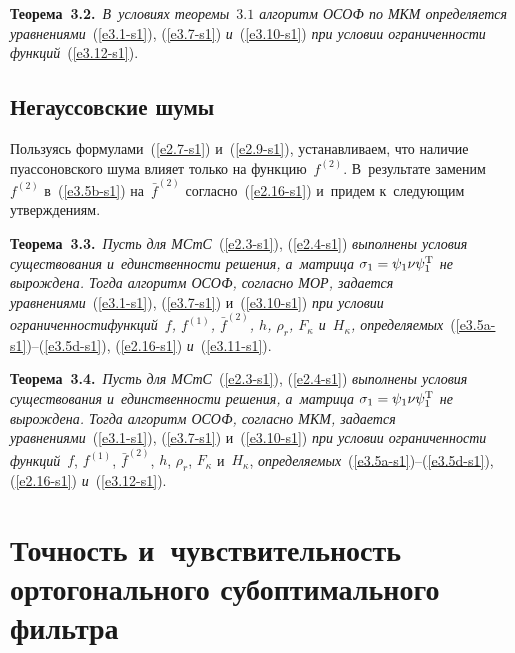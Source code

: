 \begin{multicols}{2}
\vspace*{3pt}

\noindent
\textbf{Теорема~3.2.}\
\textit{В~условиях теоремы~$3.1$ алгоритм ОСОФ по МКМ определяется 
уравнениями}~(\ref{e3.1-s1}),
(\ref{e3.7-s1}) \textit{и}~(\ref{e3.10-s1}) 
\textit{при условии ограниченности функций}~(\ref{e3.12-s1}).

\vspace*{-3pt}

\subsection{Негауссовские шумы}

Пользуясь формулами~(\ref{e2.7-s1}) и~(\ref{e2.9-s1}), устанавливаем, что наличие
 пуассоновского шума влияет только на функцию~$f^{(2)}$. В~результате заменим~$f^{(2)}$ 
 в~(\ref{e3.5b-s1}) на~$\bar f^{(2)}$ согласно~(\ref{e2.16-s1}) 
 и~придем к~следующим утверждениям.

\vspace*{3pt}

\noindent
\textbf{Теорема~3.3.}\
\textit{Пусть для МСтС}~(\ref{e2.3-s1}), (\ref{e2.4-s1}) 
\textit{выполнены условия существования и~единственности решения, а~мат\-ри\-ца $\si_1\hm=
\psi_1\nu\psi_1^{\mathrm{T}}$ не вырождена. Тогда алгоритм ОСОФ, согласно МОР, задается
 уравнениями}~(\ref{e3.1-s1}), (\ref{e3.7-s1}) и~(\ref{e3.10-s1}) 
 \textit{при условии ограниченности\linebreak функций~$f$, $f^{(1)}$, $\bar f^{(2)}$, 
 $h$, $\rho_r$, $F_\kappa$ и~$H_\kappa$, определя\-емых}~(\ref{e3.5a-s1})--(\ref{e3.5d-s1}), 
 (\ref{e2.16-s1})
 \textit{и}~(\ref{e3.11-s1}).

\vspace*{3pt}

\noindent
\textbf{Теорема~3.4.}\
\textit{Пусть для МСтС}~(\ref{e2.3-s1}), (\ref{e2.4-s1}) 
\textit{выполнены условия существования и~единственности решения, а~мат\-ри\-ца 
$\si_1\hm=\psi_1\nu\psi_1^{\mathrm{T}}$ не вырождена. Тогда алгоритм ОСОФ, 
согласно МКМ, задается уравнениями}~(\ref{e3.1-s1}), (\ref{e3.7-s1}) 
и~(\ref{e3.10-s1}) \textit{при условии ограниченности функций}~$f$, 
$f^{(1)}$, $\bar f^{(2)}$, $h$, $\rho_r$, $F_\kappa$ и~$H_\kappa$, 
\textit{определя\-емых}~(\ref{e3.5a-s1})--(\ref{e3.5d-s1}), (\ref{e2.16-s1}) \textit{и}~(\ref{e3.12-s1}).

\vspace*{-3pt}

\section{Точность и~чувствительность ортогонального субоптимального фильтра}


\end{multicols}

